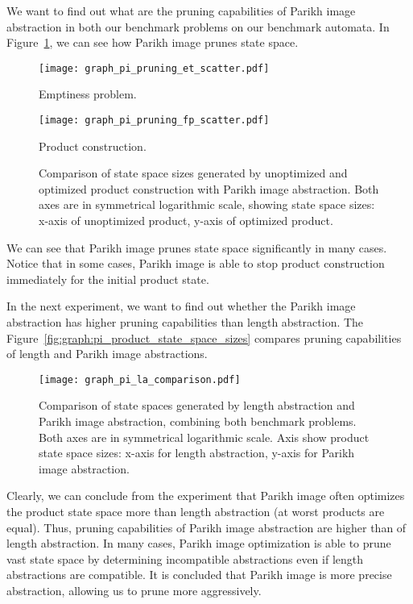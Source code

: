 We want to find out what are the pruning capabilities of Parikh image abstraction in both our benchmark problems on our benchmark automata. In Figure~\ref{fig:graph:pi_product_state_space_sizes_pruning_cap}, we can see how Parikh image prunes state space.
\begin{figure}[ht]
    \centering
    \begin{minipage}{0.49\linewidth}
        \centering
        \texttt{[image: graph\_pi\_pruning\_et\_scatter.pdf]}
        \caption{Emptiness problem.}
        \label{fig:graph:pi_et_state_space_sizes_comp}
    \end{minipage}
    \hfill
    \begin{minipage}{0.49\linewidth}
        \centering
        \texttt{[image: graph\_pi\_pruning\_fp\_scatter.pdf]}
        \caption{Product construction.}
        \label{fig:graph:pi_fp_state_space_sizes_comp}
    \end{minipage}
    \vspace{0.5cm}
    \caption{Comparison of state space sizes generated by unoptimized and optimized product construction with Parikh image abstraction. Both axes are in symmetrical logarithmic scale, showing state space sizes: x-axis of unoptimized product, y-axis of optimized product.}
    \label{fig:graph:pi_product_state_space_sizes_pruning_cap}
\end{figure}

We can see that Parikh image prunes state space significantly in many cases. Notice that in some cases, Parikh image is able to stop product construction immediately for the initial product state.

In the next experiment, we want to find out whether the Parikh image abstraction has higher pruning capabilities than length abstraction. The Figure~\ref{fig:graph:pi_product_state_space_sizes} compares pruning capabilities of length and Parikh image abstractions.

\begin{figure}[ht]
	\centering
	\texttt{[image: graph\_pi\_la\_comparison.pdf]}
	\caption{Comparison of state spaces generated by length abstraction and Parikh image abstraction, combining both benchmark problems. Both axes are in symmetrical logarithmic scale. Axis show product state space sizes: x-axis for length abstraction, y-axis for Parikh image abstraction.}
	\label{fig:diagram:pi_la_comparison}
\end{figure}

Clearly, we can conclude from the experiment that Parikh image often optimizes the product state space more than length abstraction (at worst products are equal). Thus, pruning capabilities of Parikh image abstraction are higher than of length abstraction. In many cases, Parikh image optimization is able to prune vast state space by determining incompatible abstractions even if length abstractions are compatible. It is concluded that Parikh image is more precise abstraction, allowing us to prune more aggressively.

